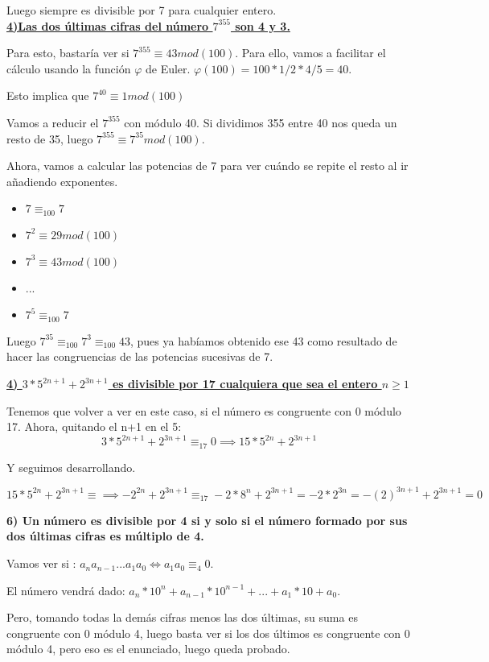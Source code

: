 \documentclass[11pt, a4paper, titlepage]{article}
\theoremstyle{theorem-style}
\theoremstyle{definition-style}
\theoremstyle{remark-style}
\theoremstyle{example-style}
\begin{document}
Luego siempre es divisible por 7 para cualquier entero.\\


\underline{\textbf{4)Las dos últimas cifras del número $7^{355}$ son 4 y 3.}}

Para esto, bastaría ver si $7^{355} \equiv 43 mod(100)$. Para ello, vamos a facilitar el cálculo usando la función $\varphi$ de Euler. $\varphi(100) = 100*1/2 * 4/5 = 40$.

Esto implica que $ 7^{40} \equiv 1 mod(100)$

Vamos a reducir el $7^{355}$ con módulo 40. Si dividimos 355 entre 40 nos queda un resto de 35, luego $7^{355} \equiv 7^{35} mod(100)$.

Ahora, vamos a calcular las potencias de 7 para ver cuándo se repite el resto al ir añadiendo exponentes.
\begin{itemize}
	\item $7 \equiv_{100} 7$
	\item $7^2 \equiv 29 mod(100)$
	\item $7^3 \equiv 43 mod(100)$
	\item ...
	\item $7^5 \equiv_{100} 7$
\end{itemize}

Luego $7^{35} \equiv_{100} 7^3 \equiv_{100} 43$, pues ya habíamos obtenido ese 43 como resultado de hacer las congruencias de las potencias sucesivas de 7.


\underline{\textbf{4) $3*5^{2n+1} + 2^{3n+1}$ es divisible por 17 cualquiera que sea el entero $n\geq 1$}}

Tenemos que volver a ver en este caso, si el número es congruente con 0 módulo 17.
Ahora, quitando el n+1 en el 5:
\[
3*5^{2n+1} + 2^{3n+1} \equiv_{17} 0  \implies 15*5^{2n} + 2^{3n+1}
\]

Y seguimos desarrollando.

\[
 15*5^{2n} + 2^{3n+1} \equiv  \implies -2^{2n} + 2^{3n+1} \equiv_{17} -2*8^n + 2^{3n+1} = -2*2^{3n} = -(2)^{3n+1} + 2^{3n+1} = 0
\]

\textbf{6) Un número es divisible por 4 si y solo si el número formado por sus dos
últimas cifras es múltiplo de 4.}

Vamos ver si : $a_n a_{n-1}...a_1a_0 \iff a_1 a_0 \equiv_4 0$.

El número vendrá dado: $a_n*10^{n}+ a_{n-1}*10^{n-1} + ... + a_1 * 10 + a_0$.

Pero, tomando todas la demás cifras menos las dos últimas, su suma es congruente con 0 módulo 4, luego  basta ver si los dos últimos es congruente con 0 módulo 4, pero eso es el enunciado, luego queda probado.
\end{document}
